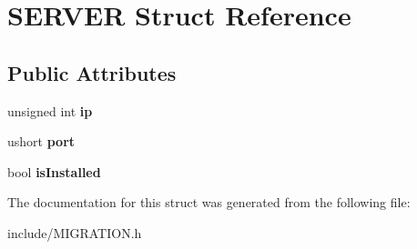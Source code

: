 \hypertarget{structSERVER}{}\section{S\+E\+R\+V\+E\+R Struct Reference}
\label{structSERVER}
\subsection*{Public Attributes}
\begin{DoxyCompactItemize}
\item 
\hypertarget{structSERVER_a5d9fee6507eb1236d34550abfd235e4b}{}unsigned int {\bfseries ip}\label{structSERVER_a5d9fee6507eb1236d34550abfd235e4b}

\item 
\hypertarget{structSERVER_acd9b37bec0e6b1360700b49daf1f95b1}{}ushort {\bfseries port}\label{structSERVER_acd9b37bec0e6b1360700b49daf1f95b1}

\item 
\hypertarget{structSERVER_af4d87b23642332eb97d95a9888ce4d1c}{}bool {\bfseries is\+Installed}\label{structSERVER_af4d87b23642332eb97d95a9888ce4d1c}

\end{DoxyCompactItemize}


The documentation for this struct was generated from the following file\+:\begin{DoxyCompactItemize}
\item 
include/M\+I\+G\+R\+A\+T\+I\+O\+N.\+h\end{DoxyCompactItemize}
